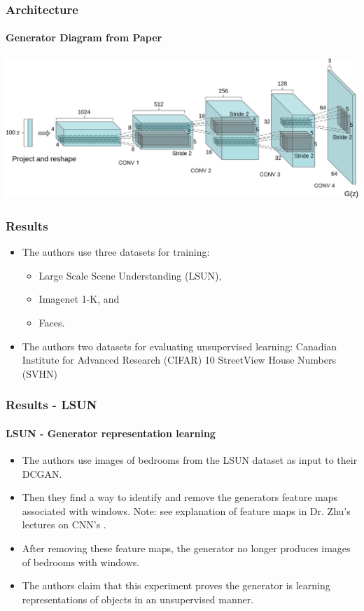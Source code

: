 \documentclass{beamer}
\begin{document}

\begin{frame}[allowframebreaks]
\frametitle{Architecture}
\framesubtitle{Generator Diagram from Paper \cite{repLearnDcgan}}
\includegraphics[scale=0.2]{generator-diagram}
\end{frame}


\begin{frame}[allowframebreaks]
\frametitle{Results}
\begin{itemize}
  \item The authors use three datasets for training:
  \begin{itemize}
    \item Large Scale Scene Understanding (LSUN),
    \item Imagenet 1-K, and
    \item Faces.
  \end{itemize}  
  \item The authors two datasets for evaluating unsupervised learning: Canadian 
    Institute for Advanced Research (CIFAR) 10 StreetView House Numbers (SVHN)
\end{itemize}
\end{frame}


\begin{frame}[allowframebreaks]
\frametitle{Results - LSUN}
\framesubtitle{LSUN - Generator representation learning}
\begin{itemize}
  \item The authors use images of bedrooms from the LSUN dataset
  \cite{lsunDataset} as input to their DCGAN.

  \item Then they find a way to identify and remove the generators feature maps
  \cite{repLearnDcgan} associated with windows.  Note: see explanation of feature
  maps in Dr. Zhu's lectures on CNN's \cite{cnnlecture}. 

  \item After removing these feature maps, the generator no longer produces images
    of bedrooms with windows.

  \item The authors claim that this experiment proves the generator is learning
   representations of objects in an unsupervised manner. 
\end{itemize}
\end{frame}
\end{document}

